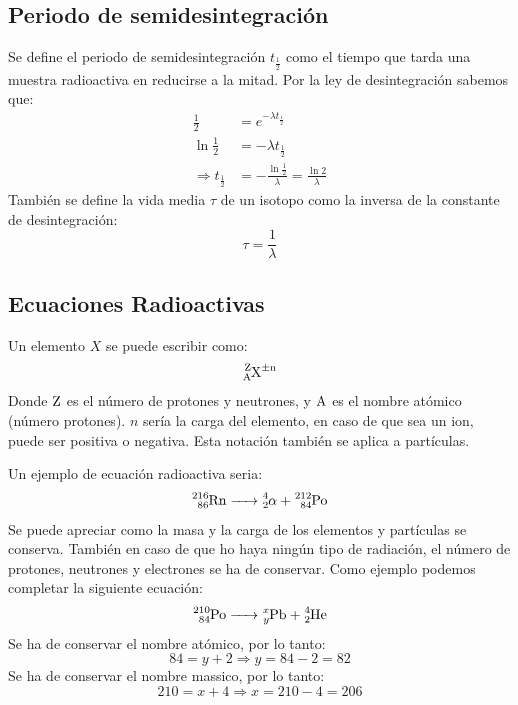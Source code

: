\documentclass[arial,a4paper,print]{article}
\begin{document}
\subsection{Periodo de semidesintegración}
Se define el periodo de semidesintegración $t_{\frac12}$ como el tiempo que tarda una muestra radioactiva en reducirse a la mitad. Por la ley de desintegración sabemos que:
\begin{align*}
	\frac{1}{2} &= e^{-\lambda t_{\frac12}} \\
	\ln\frac12 &= -\lambda t_{\frac12}\\
	\Rightarrow t_{\frac12} &= -\frac{\ln\frac12}{\lambda} = \frac{\ln2}{\lambda}
\end{align*}
También se define la vida media $\tau$ de un isotopo como la inversa de la constante de desintegración:
\begin{equation*}
	\tau = \frac1\lambda
\end{equation*}

\subsection{Ecuaciones Radioactivas}
Un elemento $X$ se puede escribir como:
\begin{equation*}
	\ce{^Z_AX^{\pm n}}
\end{equation*}
Donde $\ce{Z}$ es el número de protones y neutrones, y $\ce{A}$ es el nombre atómico (número protones). $n$ sería la carga del elemento, en caso de que sea un ion, puede ser positiva o negativa. Esta notación también se aplica a partículas. 

Un ejemplo de ecuación radioactiva seria:
\begin{equation*}
	\ce{^216_{86}Rn -> ^4_2\alpha_ + ^212_84Po}
\end{equation*}
Se puede apreciar como la masa y la carga de los elementos y partículas se conserva. También en caso de que ho haya ningún tipo de radiación, el número de protones, neutrones y electrones se ha de conservar. Como ejemplo podemos completar la siguiente ecuación:
\begin{equation*}
	\ce{^{210}_{84}Po -> ^{x}_{y}Pb + ^{4}_{2}He}
\end{equation*}
Se ha de conservar el nombre atómico, por lo tanto:
\begin{equation*}
	84 = y + 2 \Rightarrow y = 84-2=82
\end{equation*}
Se ha de conservar el nombre massico, por lo tanto:
\begin{equation*}
	210 = x+ 4 \Rightarrow x = 210 -4=206
\end{equation*}
\end{document}
